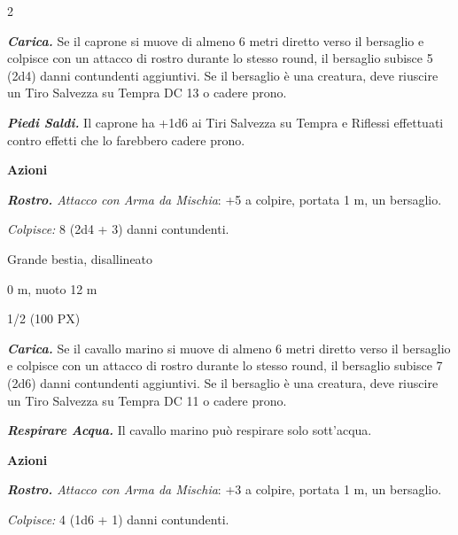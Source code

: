 \begin{multicols}{2}
{\emph{\textbf{Carica.}} Se il caprone si muove di almeno 6 metri diretto verso il bersaglio e colpisce con un attacco di rostro durante lo stesso round, il bersaglio subisce 5 (2d4) danni contundenti aggiuntivi. Se il bersaglio è una creatura, deve riuscire un Tiro Salvezza su Tempra DC 13 o cadere prono.

\emph{\textbf{Piedi Saldi.}} Il caprone ha +1d6 ai Tiri Salvezza su Tempra e Riflessi effettuati contro effetti che lo farebbero cadere prono.

\textbf{Azioni}

\emph{\textbf{Rostro.} Attacco con Arma da Mischia}: +5 a colpire, portata 1 m, un bersaglio.

\emph{Colpisce:} 8 (2d4 + 3) danni contundenti.

\begin{description}[noitemsep, topsep=0pt, parsep=0pt, partopsep=0pt, itemsep=1pt, leftmargin=2.35cm,  labelwidth=2.2cm, itemindent=0cm, listparindent=0pt] %
\setlength{\baselineskip}{10pt}
\item[\textbf{Taglia/Tipo}] Grande bestia, disallineato
\item[\textbf{Caratt.}] 
\item[\textbf{Punti Ferita}] 
\item[\textbf{Tiri Salvez.}] 
\item[\textbf{Movimento}] 0 m, nuoto 12 m
\item[\textbf{Sfida}] 1/2 (100 PX)
\end{description}
\smallskip

\emph{\textbf{Carica.}} Se il cavallo marino si muove di almeno 6 metri diretto verso il bersaglio e colpisce con un attacco di rostro durante lo stesso round, il bersaglio subisce 7 (2d6) danni contundenti aggiuntivi. Se il bersaglio è una creatura, deve riuscire un Tiro Salvezza su Tempra DC 11 o cadere prono.

\emph{\textbf{Respirare Acqua.}} Il cavallo marino può respirare solo sott'acqua.

\textbf{Azioni}

\emph{\textbf{Rostro.} Attacco con Arma da Mischia}: +3 a colpire, portata 1 m, un bersaglio.

\emph{Colpisce:} 4 (1d6 + 1) danni contundenti.

}
\end{multicols}
